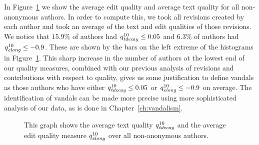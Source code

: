 In Figure~\ref{fig-user-quality} we show the average edit quality
and average text quality for all non-anonymous authors.
In order to compute this, we took all revisions created by each
author and took an average of the text and edit qualities of
those revisions.
We notice that $15.9\%$ of authors had $\quality{tdecay}{10}{} \le 0.05$
and $6.3\%$ of authors had $\quality{elong}{10}{} \le -0.9$.
These are shown by the bars on the left extreme of the
histograms in Figure~\ref{fig-user-quality}.
This sharp increase in the number of authors at the lowest end
of our quality measures, combined with our previous analysis
of revisions and contributions with respect to quality, gives
us some justification to define vandals as those
authors who have either $\quality{tdecay}{10}{} \le 0.05$ or
$\quality{elong}{10}{} \le -0.9$ on average.
The identification of vandals can be made more
precise using more sophisticated analysis of our data,
as is done in Chapter~\ref{ch:vandalism}.
%
\begin{figure}[tbhp]
    \begin{center}
    \end{center}
    \caption[Measuring edit and text quality for all authors]{
    	This graph shows the average text quality $\quality{tdecay}{10}{}$
	and the average edit quality measure $\quality{elong}{10}{}$
	over all non-anonymous authors.
    }
    \label{fig-user-quality}
\end{figure}
%

